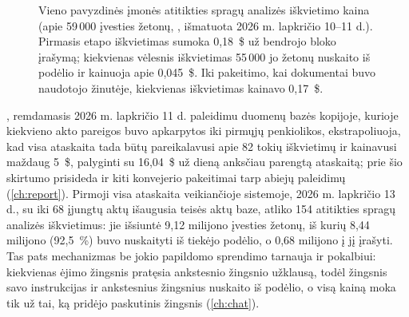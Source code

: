 \begin{figure}[H]
\centering
{}
\caption{Vieno pavyzdinės įmonės atitikties spragų analizės iškvietimo kaina (apie 59\,000
įvesties žetonų, , išmatuota 2026 m. lapkričio 10--11 d.). Pirmasis etapo
iškvietimas sumoka 0,18~\$ už bendrojo bloko įrašymą; kiekvienas vėlesnis iškvietimas 55\,000
jo žetonų nuskaito iš podėlio ir kainuoja apie 0,045~\$. Iki pakeitimo, kai dokumentai buvo
naudotojo žinutėje, kiekvienas iškvietimas kainavo 0,17~\$.}\label{fig:models:cachecost}
\end{figure}

, remdamasis 2026 m. lapkričio 11 d. paleidimu duomenų bazės
kopijoje, kurioje kiekvieno akto pareigos buvo apkarpytos iki pirmųjų penkiolikos, ekstrapoliuoja,
kad visa ataskaita tada būtų pareikalavusi apie 82 tokių iškvietimų ir kainavusi maždaug 5~\$, palyginti su
16,04~\$ už dieną anksčiau parengtą ataskaitą; prie šio skirtumo prisideda ir kiti konvejerio
pakeitimai tarp abiejų paleidimų (\cref{ch:report}). Pirmoji visa ataskaita veikiančioje
sistemoje, 2026 m. lapkričio 13 d., su iki 68 įjungtų aktų išaugusia teisės aktų baze, atliko
154 atitikties spragų analizės iškvietimus: jie išsiuntė 9,12 milijono įvesties žetonų, iš
kurių 8,44 milijono (92,5~\%) buvo nuskaityti iš tiekėjo podėlio, o 0,68 milijono į jį
įrašyti. Tas pats mechanizmas be jokio papildomo sprendimo tarnauja ir pokalbiui: kiekvienas
ėjimo žingsnis pratęsia ankstesnio žingsnio užklausą, todėl žingsnis savo instrukcijas ir
ankstesnius žingsnius nuskaito iš podėlio, o visą kainą moka tik už tai, ką pridėjo paskutinis
žingsnis (\cref{ch:chat}).

